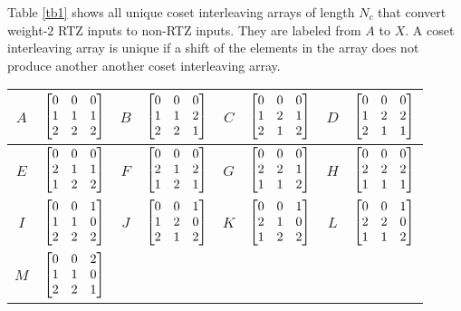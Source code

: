 Table \ref{tb1} shows all unique coset interleaving arrays of length $N_c$ that convert weight-$2$ RTZ inputs to non-RTZ inputs. They are labeled from $A$ to $X$. A coset interleaving array is unique if a shift of the elements in the array does not produce another another coset interleaving array.

\begin{table}[h!]
\centering
\begin{tabular}{|c || c | c|| c|c || c | c|| c|} 
 \hline
 $A$ & $ \begin{bmatrix}0 & 0 & 0\cr1 & 1 & 1\cr2 & 2 & 2\end{bmatrix}$ 
 &
  $B$ & $\begin{bmatrix} 0 & 0 & 0 \cr 1 & 1 & 2 \cr 2 & 2 & 1\end{bmatrix}$ 
  &
  $C$ &$\begin{bmatrix} 0 & 0 & 0 \cr 1 & 2 & 1 \cr 2 & 1 & 2\end{bmatrix}$
  &
  $D$ & $\begin{bmatrix}0 & 0 & 0 \cr 1 & 2 & 2 \cr 2 & 1 & 1\end{bmatrix}$\\
 \hline
  $E$ & $\begin{bmatrix}0 & 0 & 0 \cr 2 & 1 & 1 \cr 1 & 2 & 2\end{bmatrix}$ 
 &
 $F$ & $\begin{bmatrix}0 & 0 & 0 \cr 2 & 1 & 2 \cr 1 & 2 & 1\end{bmatrix}$ 
 &
  $G$ & $\begin{bmatrix}0 & 0 & 0 \cr 2 & 2 & 1 \cr 1 & 1 & 2\end{bmatrix}$ 
 &
  $H$ & $\begin{bmatrix} 0 & 0 & 0\cr 2 & 2 & 2\cr 1 & 1 & 1\end{bmatrix}$\\ 
 \hline
   $I$ & $\begin{bmatrix} 0 & 0 & 1 \cr 1 & 1 & 0 \cr 2 & 2 & 2\end{bmatrix}$
 &
  $J$ & $\begin{bmatrix}0 & 0 & 1 \cr 1 & 2 & 0 \cr 2 & 1 & 2\end{bmatrix}$ 
 &
  $K$ & $\begin{bmatrix}0 & 0 & 1 \cr 2 & 1 & 0 \cr 1 & 2 & 2 \end{bmatrix}$
 &
 $L$ & $\begin{bmatrix}0 & 0 & 1 \cr 2 & 2 & 0 \cr 1 & 1 & 2\end{bmatrix}$\\ 
 \hline
 $M$ & $\begin{bmatrix}0 & 0 & 2 \cr 1 & 1 & 0 \cr 2 & 2 & 1 \end{bmatrix}$

\end{tabular}
\end{table}
